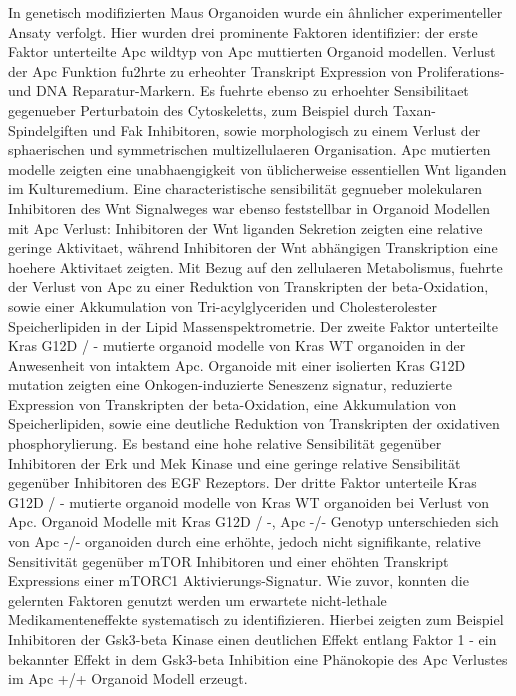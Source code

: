 In genetisch modifizierten Maus Organoiden wurde ein âhnlicher experimenteller Ansaty verfolgt. Hier wurden drei prominente Faktoren identifizier: der erste Faktor unterteilte Apc wildtyp von Apc muttierten Organoid modellen. Verlust der Apc Funktion fu2hrte zu erheohter Transkript Expression von Proliferations- und DNA Reparatur-Markern. Es fuehrte ebenso zu erhoehter Sensibilitaet gegenueber Perturbatoin des Cytoskeletts, zum Beispiel durch Taxan-Spindelgiften und Fak Inhibitoren, sowie morphologisch zu einem Verlust der sphaerischen und symmetrischen multizellulaeren Organisation. Apc mutierten modelle zeigten eine unabhaengigkeit von üblicherweise essentiellen Wnt liganden im Kulturemedium. Eine characteristische sensibilität gegnueber molekularen Inhibitoren des  Wnt Signalweges war ebenso feststellbar in Organoid Modellen mit Apc Verlust: Inhibitoren der Wnt liganden Sekretion zeigten eine relative geringe Aktivitaet, während Inhibitoren der Wnt abhängigen Transkription eine hoehere Aktivitaet zeigten. Mit Bezug auf den zellulaeren Metabolismus, fuehrte der Verlust von Apc zu einer Reduktion von Transkripten der beta-Oxidation, sowie einer Akkumulation von Tri-acylglyceriden und Cholesterolester Speicherlipiden in der Lipid Massenspektrometrie.
Der zweite Faktor unterteilte Kras G12D / - mutierte organoid modelle von Kras WT organoiden in der Anwesenheit von intaktem Apc. Organoide mit einer isolierten Kras G12D mutation zeigten eine Onkogen-induzierte Seneszenz signatur, reduzierte  Expression von Transkripten der beta-Oxidation, eine Akkumulation von Speicherlipiden, sowie eine deutliche Reduktion von Transkripten der oxidativen phosphorylierung. Es bestand eine hohe relative Sensibilität gegenüber Inhibitoren der Erk und Mek Kinase und eine geringe relative Sensibilität gegenüber Inhibitoren des EGF Rezeptors. 
Der dritte Faktor unterteile Kras G12D / - mutierte organoid modelle von Kras WT organoiden bei Verlust von Apc. Organoid Modelle mit  Kras G12D / -, Apc -/- Genotyp unterschieden sich von  Apc -/- organoiden durch eine erhöhte, jedoch nicht signifikante, relative Sensitivität gegenüber mTOR Inhibitoren und einer ehöhten Transkript Expressions einer mTORC1 Aktivierungs-Signatur.
Wie zuvor, konnten die gelernten Faktoren genutzt werden um erwartete nicht-lethale Medikamenteneffekte systematisch zu identifizieren. Hierbei zeigten zum Beispiel Inhibitoren der Gsk3-beta Kinase einen deutlichen Effekt entlang Faktor 1 - ein bekannter Effekt in dem Gsk3-beta Inhibition eine Phänokopie des Apc Verlustes im Apc +/+ Organoid Modell erzeugt.

